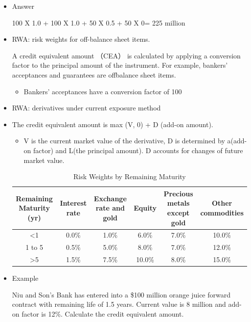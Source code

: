\begin{itemize}
\item Answer


100 X 1.0 + 100 X 1.0 + 50 X 0.5 + 50 X 0= 225 million


\item RWA: risk weights for off-balance sheet items.

A credit equivalent amount （CEA） is calculated by applying a
conversion factor to the principal amount of the instrument.
For example, bankers' acceptances and guarantees are offbalance
sheet items.

    \begin{itemize}
    \item Bankers' acceptances have a conversion factor of 100%
    \end{itemize}

\item RWA: derivatives under current exposure method

\item The credit equivalent amount is max (V, 0) + D (add-on amount).
    \begin{itemize}
    \item V is the current market value of the derivative, D is determined by a(add-on factor) and L(the principal amount). D accounts for changes of future market value.
    \end{itemize}
    \begin{table}[h]
        \centering
        \caption{Risk Weights by Remaining Maturity}
        \renewcommand{\arraystretch}{1.5} %
        \begin{tabular}{|c|c|c|c|c|c|}
            \hline
            \textbf{Remaining Maturity (yr)} & \textbf{Interest rate} & \textbf{Exchange rate and gold} & \textbf{Equity} & \textbf{Precious metals except gold} & \textbf{Other commodities} \\
            \hline
            <1 & 0.0\% & 1.0\% & 6.0\% & 7.0\% & 10.0\% \\
            \hline
            1 to 5 & 0.5\% & 5.0\% & 8.0\% & 7.0\% & 12.0\% \\
            \hline
            >5 & 1.5\% & 7.5\% & 10.0\% & 8.0\% & 15.0\% \\
            \hline
        \end{tabular}
    \end{table}

\item Example

Niu and Son's Bank has entered into a \$100 million orange
juice forward contract with remaining life of 1.5 years.
Current value is 8 million and add-on factor is 12\%. Calculate
the credit equivalent amount.


\end{itemize}
